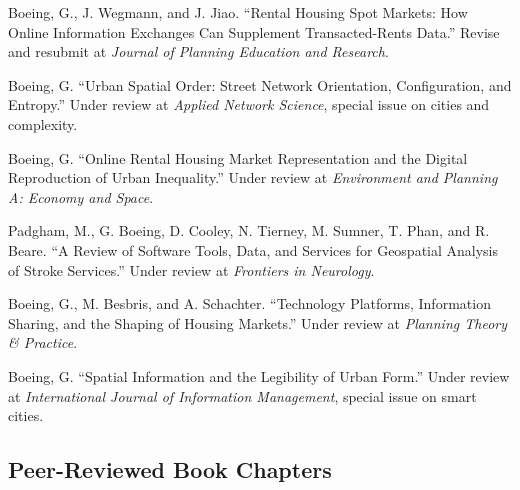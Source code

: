 \documentclass[12pt,letterpaper]{report}
\begin{document}
	\begin{tablist}

		\item[\the\year] \tab Boeing, G., J. Wegmann, and J. Jiao. \enquote{Rental Housing Spot Markets: How Online Information Exchanges Can Supplement Transacted-Rents Data.} Revise and resubmit at \textit{Journal of Planning Education and Research}.

		\item[\the\year] \tab Boeing, G. \enquote{Urban Spatial Order: Street Network Orientation, Configuration, and Entropy.} Under review at \textit{Applied Network Science}, special issue on cities and complexity.

		\item[\the\year] \tab Boeing, G. \enquote{Online Rental Housing Market Representation and the Digital Reproduction of Urban Inequality.} Under review at \textit{Environment and Planning A: Economy and Space}.

		\item[\the\year] \tab Padgham, M., G. Boeing, D. Cooley, N. Tierney, M. Sumner, T. Phan, and R. Beare. \enquote{A Review of Software Tools, Data, and Services for Geospatial Analysis of Stroke Services.} Under review at \textit{Frontiers in Neurology}.

		\item[\the\year] \tab Boeing, G., M. Besbris, and A. Schachter. \enquote{Technology Platforms, Information Sharing, and the Shaping of Housing Markets.} Under review at \textit{Planning Theory \& Practice}.

		\item[\the\year] \tab Boeing, G. \enquote{Spatial Information and the Legibility of Urban Form.} Under review at \textit{International Journal of Information Management}, special issue on smart cities.

	\end{tablist}



	\subsection*{Peer-Reviewed Book Chapters}
\end{document}

